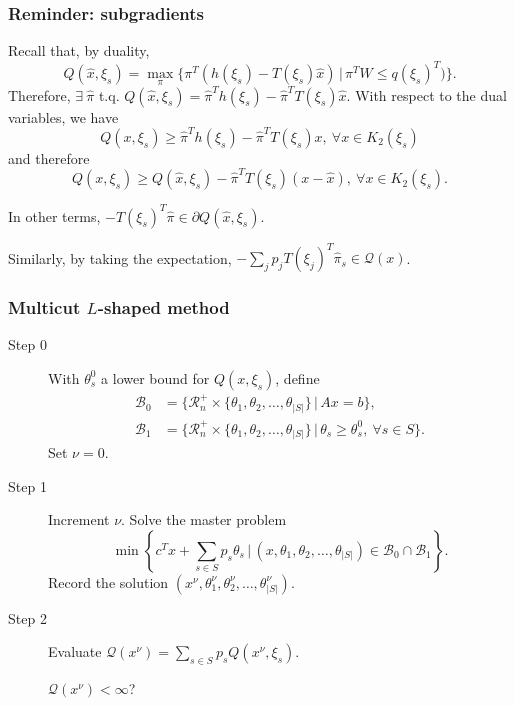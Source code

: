 \documentclass{beamer}
\def\rit{\mathcal{R}}
\begin{document}
\begin{frame}
\frametitle{Reminder: subgradients}

Recall that, by {\blue duality},
\[
Q(\hat{x}, \xi_s) =
\max_{\pi} \lbrace \pi^T(h(\xi_s)-T(\xi_s)\hat{x}) \,|\, \pi^TW \leq q(\xi_s)^T) \rbrace.
\]
Therefore, $\exists\ \hat{\pi}$ t.q.
$Q(\hat{x}, \xi_s) = \hat{\pi}^Th(\xi_s)-\hat{\pi}^TT(\xi_s)\hat{x}$.
With respect to the dual variables, we have
\[
Q(x, \xi_s) \geq \hat{\pi}^Th(\xi_s)-\hat{\pi}^TT(\xi_s) x,
\ \forall x \in K_2(\xi_s)
\]
and therefore
\[
Q(x, \xi_s) \geq Q({\hat{x}, \xi_s}) - \hat{\pi}^TT(\xi_s) (x-\hat{x}),
\ \forall x \in K_2(\xi_s).
\]

In other terms, $-T(\xi_s)^T\hat{\pi} \in \partial Q(\hat{x}, \xi_s)$.

\mbox{}

Similarly, by taking the expectation, $- \sum_j p_j T(\xi_j)^T\hat{\pi}_s \in \mathcal{Q}(x)$.

\end{frame}

\begin{frame}
\frametitle{Multicut $L$-shaped method}
	
\begin{description}
\item[Step 0]
With $\theta_s^0$ a lower bound for $Q(x, \xi_s)$, define
\begin{align*}
\mathcal{B}_0 &= \lbrace \rit_n^+ \times \lbrace \theta_1,
\theta_2,\ldots, \theta_{|S|}\rbrace \,|\, Ax = b \rbrace, \\
\mathcal{B}_1 &= \lbrace \rit_n^+ \times \lbrace \theta_1,
\theta_2,\ldots, \theta_{|S|}\rbrace \,|\, \theta_s \geq \theta_s^0,\
\forall s \in S \rbrace.
\end{align*}
Set $\nu = 0$.
\item[Step 1]
Increment $\nu$.
Solve the master problem
\[
\min \left\lbrace c^Tx+\sum_{s \in S} p_s\theta_s \,|\,
(x,\theta_1,\theta_2,\ldots,\theta_{|S|}) \in \mathcal{B}_0 \cap \mathcal{B}_1 \right\rbrace.
\]
Record the solution $( x^{\nu}, \theta_1^{\nu}, \theta_2^{\nu},\ldots,
\theta_{|S|}^{\nu} )$.
\item[Step 2]
Evaluate $\mathcal{Q}(x^{\nu}) = \sum_{s \in S} p_s Q(x^{\nu}, \xi_s)$.
		
		$\mathcal{Q}(x^{\nu}) < \infty$?
\end{description}
	
\end{frame}
\end{document}
